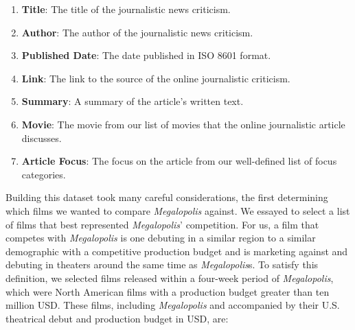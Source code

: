 \documentclass[letterpaper]{article} %
\begin{document}
\begin{enumerate}
    \item \textbf{Title}: The title of the journalistic news criticism.
    
    \item \textbf{Author}: The author of the journalistic news criticism.
    
    \item \textbf{Published Date}: The date published in ISO 8601 format.
    
    \item \textbf{Link}: The link to the source of the online journalistic criticism.
    
    \item \textbf{Summary}: A summary of the article's written text.
    
    \item \textbf{Movie}: The movie from our list of movies that the online journalistic article discusses.
    
    \item \textbf{Article Focus}: The focus on the article from our well-defined list of focus categories.
\end{enumerate}

Building this dataset took many careful considerations, the first determining which films we wanted to compare \textit{Megalopolis} against. We essayed to select a list of films that best represented \textit{Megalopolis}' competition. For us, a film that competes with \textit{Megalopolis} is one debuting in a similar region to a similar demographic with a competitive production budget and is marketing against and debuting in theaters around the same time as \textit{Megalopolis}s. To satisfy this definition, we selected films released within a four-week period of \textit{Megalopolis}, which were North American films with a production budget greater than ten million USD. These films, including \textit{Megalopolis} and accompanied by their U.S. theatrical debut and production budget in USD, are:
\end{document}
